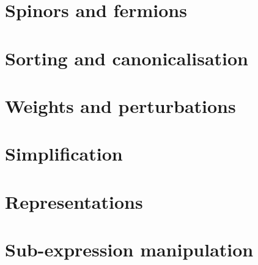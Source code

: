 \documentclass[11pt]{book}
\begin{document}
\section{Spinors and fermions}







\section{Sorting and canonicalisation}
  








\section{Weights and perturbations}




\section{Simplification}






\section{Representations}





\section{Sub-expression manipulation}





\printbibliography
\end{document}
